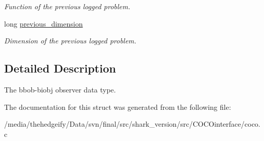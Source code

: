 \begin{DoxyCompactItemize}
\begin{DoxyCompactList}\small\item\em Function of the previous logged problem. \end{DoxyCompactList}\item 
long \hyperlink{structobserver__biobj__data__t_a770933b27be9e793fa54dad128400c1b}{previous\+\_\+dimension}\hypertarget{structobserver__biobj__data__t_a770933b27be9e793fa54dad128400c1b}{}\label{structobserver__biobj__data__t_a770933b27be9e793fa54dad128400c1b}

\begin{DoxyCompactList}\small\item\em Dimension of the previous logged problem. \end{DoxyCompactList}\end{DoxyCompactItemize}


\subsection{Detailed Description}
The bbob-\/biobj observer data type. 

The documentation for this struct was generated from the following file\+:\begin{DoxyCompactItemize}
\item 
/media/thehedgeify/\+Data/svn/final/src/shark\+\_\+version/src/\+C\+O\+C\+Ointerface/coco.\+c\end{DoxyCompactItemize}
